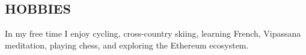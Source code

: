 \documentclass[margin,line]{resume}
\begin{document}
\begin{resume}
    \vspace{-1mm}

\sectionline
    \section{\mysidestyle \textbf{\large{H}\small{OBBIES}}}

    In my free time I enjoy cycling, cross-country skiing, learning French, Vipassana meditation, playing chess, and exploring the Ethereum ecosystem.


\end{resume}
\end{document}
